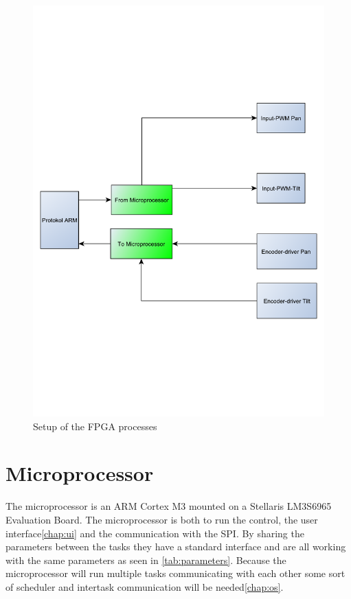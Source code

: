 \begin{figure}[htb]
	\centering
	\includegraphics[scale=0.42,trim=200 200 200 200]{graphics/FPGA} %
	\caption{Setup of the FPGA processes}
	\label{fig:FPGA}			%
\end{figure}

\section{Microprocessor}\label{sec:microprocessor}

The microprocessor is an ARM Cortex M3 mounted on a Stellaris LM3S6965 Evaluation Board. The microprocessor is both to run the control, the user interface\ref{chap:ui} and the communication with the SPI. By sharing the parameters between the tasks they have a standard interface and are all working with the same parameters as seen in  \ref{tab:parameters}. Because the microprocessor will run multiple tasks communicating with each other some sort of scheduler and intertask communication will be needed\ref{chap:os}.

